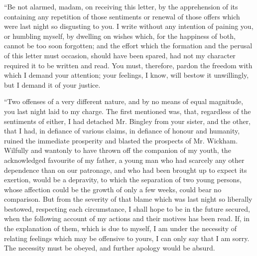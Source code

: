 “Be not alarmed, madam, on receiving this letter, by the apprehension of its containing any repetition of those sentiments or renewal of those offers which were last night so disgusting to you. I write without any intention of paining you, or humbling myself, by dwelling on wishes which, for the happiness of both, cannot be too soon forgotten; and the effort which the formation and the perusal of this letter must occasion, should have been spared, had not my character required it to be written and read. You must, therefore, pardon the freedom with which I demand your attention; your feelings, I know, will bestow it unwillingly, but I demand it of your justice.

“Two offenses of a very different nature, and by no means of equal magnitude, you last night laid to my charge. The first mentioned was, that, regardless of the sentiments of either, I had detached Mr. Bingley from your sister, and the other, that I had, in defiance of various claims, in defiance of honour and humanity, ruined the immediate prosperity and blasted the prospects of Mr. Wickham. Wilfully and wantonly to have thrown off the companion of my youth, the acknowledged favourite of my father, a young man who had scarcely any other dependence than on our patronage, and who had been brought up to expect its exertion, would be a depravity, to which the separation of two young persons, whose affection could be the growth of only a few weeks, could bear no comparison. But from the severity of that blame which was last night so liberally bestowed, respecting each circumstance, I shall hope to be in the future secured, when the following account of my actions and their motives has been read. If, in the explanation of them, which is due to myself, I am under the necessity of relating feelings which may be offensive to yours, I can only say that I am sorry. The necessity must be obeyed, and further apology would be absurd.

